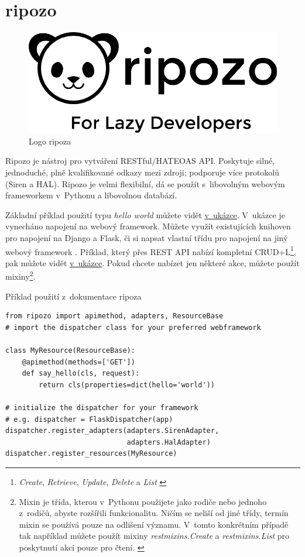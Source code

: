 \section{ripozo}\label{ripozo}

\begin{figure}
\centering
\includegraphics{images/ripozo}
\caption{Logo ripoza \autocite{ripozopic}\label{pic:ripozo}}
\end{figure}

Ripozo je nástroj pro vytváření RESTful/HATEOAS API. Poskytuje silné, jednoduché, plně kvalifikované odkazy mezi zdroji; podporuje více protokolů (Siren a HAL). Ripozo je velmi flexibilní, dá se použít s~libovolným webovým frameworkem v~Pythonu a libovolnou databází. \autocite{ripozo}

Základní příklad použití typu \emph{hello world} můžete vidět \protect\hyperlink{code:ripozo}{v~ukázce}. V~ukázce je vynecháno napojení na webový framework. Můžete využít existujících knihoven pro napojení na Django a Flask, či si napsat vlastní třídu pro napojení na jiný webový framework \autocite{ripozo}. Příklad, který přes REST API nabízí kompletní CRUD+L\footnote{\emph{Create}, \emph{Retrieve}, \emph{Update}, \emph{Delete} a \emph{List} \autocite{crud}}, pak můžete vidět \protect\hyperlink{code:ripozocrudl}{v~ukázce}. Pokud chcete nabízet jen některé akce, můžete použít mixiny\footnote{Mixin je třída, kterou v~Pythonu použijete jako rodiče nebo jednoho z~rodičů, abyste rozšířili funkcionalitu. Ničím se neliší od jiné třídy, termín mixin se používá pouze na odlišení významu. V~tomto konkrétním případě tak například můžete použít mixiny \emph{restmixins.Create} a \emph{restmixins.List} pro poskytnutí akcí pouze pro čtení. \autocite{mixin}}.

\begin{listing}[htbp]
\caption{{\label{code:ripozo}Příklad použití z~dokumentace ripoza \autocite{ripozo}}}
\begin{verbatim}
from ripozo import apimethod, adapters, ResourceBase
# import the dispatcher class for your preferred webframework

class MyResource(ResourceBase):
    @apimethod(methods=['GET'])
    def say_hello(cls, request):
        return cls(properties=dict(hello='world'))

# initialize the dispatcher for your framework
# e.g. dispatcher = FlaskDispatcher(app)
dispatcher.register_adapters(adapters.SirenAdapter,
                             adapters.HalAdapter)
dispatcher.register_resources(MyResource)
\end{verbatim}
\end{listing}

